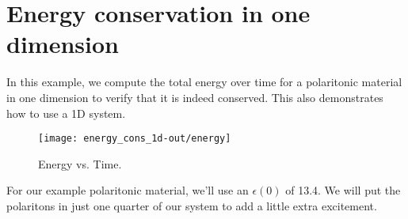 \begin{comment}
#include <stdio.h>
#include <stdlib.h>
#include <signal.h>
\end{comment}

\section{Energy conservation in one dimension}

In this example, we compute the total energy over time for a polaritonic
material in one dimension to verify that it is indeed conserved.  This also
demonstrates how to use a 1D system.

\begin{figure}
\label{econs_1d}
\caption{Energy vs. Time.}
\texttt{[image: energy\_cons\_1d-out/energy]}
\end{figure}

\begin{comment}
#include <meep.h>
using namespace meep;

const double a = 10;
\end{comment}

For our example polaritonic material, we'll use an $\epsilon(0)$ of 13.4.
We will put the polaritons in just one quarter of our system to add a
little extra excitement.

